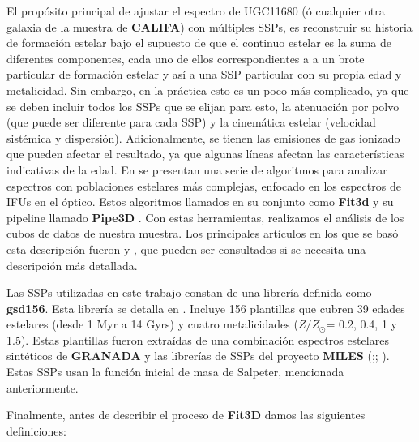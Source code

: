 \bigskip

\noindent El propósito principal de ajustar el espectro de UGC11680 (ó cualquier otra galaxia de la muestra de \textbf{CALIFA}) con múltiples SSPs, es reconstruir su historia de formación estelar bajo el supuesto de que el continuo estelar es la suma de diferentes componentes, cada uno de ellos correspondientes a a un brote particular de formación estelar y así a una SSP particular con su propia edad y metalicidad. Sin embargo, en la práctica esto es un poco más complicado, ya que se deben incluir todos los SSPs que se elijan para esto, la atenuación por polvo (que puede ser diferente para cada SSP) y la cinemática estelar (velocidad sistémica y dispersión). Adicionalmente, se tienen las emisiones de gas ionizado que pueden afectar el resultado, ya que algunas líneas afectan las características indicativas de la edad. En \citep{pipe1} se presentan una serie de algoritmos para analizar espectros con poblaciones estelares más complejas, enfocado en los espectros de IFUs en el óptico. Estos algoritmos llamados en su conjunto como \textbf{Fit3d} y su pipeline llamado \textbf{Pipe3D} \citep{pipe2}. Con estas herramientas, realizamos el análisis de los cubos de datos de nuestra muestra. Los principales artículos en los que se basó esta descripción fueron \citep{pipe1} y \citep{pipe2}, que pueden ser consultados si se necesita una descripción más detallada.

\bigskip

\noindent Las SSPs utilizadas en este trabajo constan de una librería definida como \textbf{gsd156}. Esta librería se detalla
en \cite{cid2013_1}. Incluye 156 plantillas que cubren 39 edades estelares (desde 1 Myr a 14 Gyrs) y cuatro metalicidades
($Z/Z_{\odot}$= 0.2, 0.4, 1 y 1.5). Estas plantillas fueron extraídas de una combinación espectros estelares sintéticos
de \textbf{GRANADA} \citep{martins2005} y las librerías de SSPs del proyecto \textbf{MILES} (\cite{blazquez2006};\cite{vazdekis2010}; \cite{falcon2011}). Estas SSPs usan la función inicial de masa de Salpeter, mencionada anteriormente.

\bigskip

\noindent Finalmente, antes de describir el proceso de \textbf{Fit3D} damos las siguientes definiciones:

